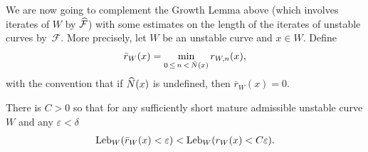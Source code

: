 \documentclass[AHL, Unicode, longabstracts,published]{cedram}
\newcommand{\eps}{\varepsilon}
\newcommand{\cm}{\mathcal{F}}
\newcommand{\cmp}{\hat\cm}
\newcommand{\admiss}{admissible}
\newcommand{\Np}{\hat N}
\newcommand{\Leb}{\textup{Leb}}
\let\oldhat\hat
\renewcommand*{\hat}[1]{\mathchoice{\widehat{#1}}{\widehat{#1}}{\oldhat{#1}}{\oldhat{#1}}}
\begin{document}
We are now going to complement the Growth Lemma above (which involves iterates of $W$ by $\cmp$) with some estimates on the length of the iterates of unstable curves by~$\cm$. More precisely, let $W$ be an unstable curve and $x\in W$. Define
\begin{align*}
\bar r_{W}(x) = \min_{0\,\le\,n\,<\,\Np(x)}r_{W,n}(x),
\end{align*}
with the convention that if $\Np(x)$ is undefined, then $\bar r_{W}(x) = 0$.

\begin{lemm}\label{lem:transient-growth-control}
There is $C > 0$ so that for any sufficiently short mature
\admiss{} unstable curve $W$ and any $\eps<\delta$
\begin{align*}
\Leb_{W}(\bar r_{W}(x) < \eps) < \Leb_{W}(r_{W}(x) < C\eps).
\end{align*}
\end{lemm}
\end{document}
